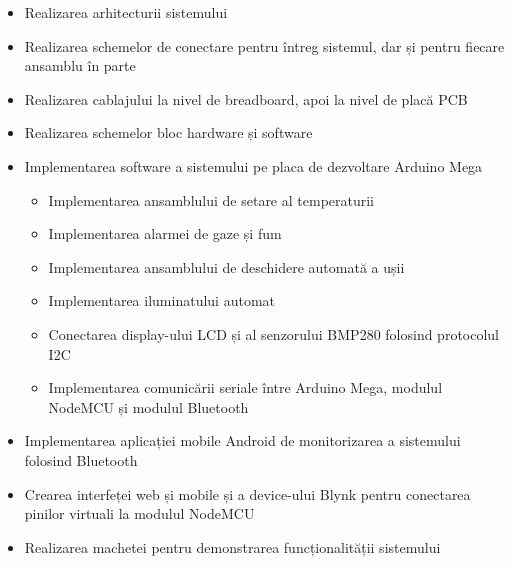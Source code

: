 \begin{itemize}
    \item Realizarea arhitecturii sistemului
    \item Realizarea schemelor de conectare pentru întreg sistemul, dar și pentru fiecare ansamblu în parte
    \item Realizarea cablajului la nivel de breadboard, apoi la nivel de placă PCB
    \item Realizarea schemelor bloc hardware și software
    \item Implementarea software a sistemului pe placa de dezvoltare Arduino Mega
        \begin{itemize}
            \item Implementarea ansamblului de setare al temperaturii
            \item Implementarea alarmei de gaze și fum
            \item Implementarea ansamblului de deschidere automată a ușii
            \item Implementarea iluminatului automat
            \item Conectarea display-ului LCD și al senzorului BMP280 folosind protocolul I2C
            \item Implementarea comunicării seriale între Arduino Mega, modulul NodeMCU și modulul Bluetooth
        \end{itemize}
    \item Implementarea aplicației mobile Android de monitorizarea a sistemului folosind Bluetooth
    \item Crearea interfeței web și mobile și a device-ului Blynk pentru conectarea pinilor virtuali la modulul NodeMCU
    \item Realizarea machetei pentru demonstrarea funcționalității sistemului
\end{itemize}